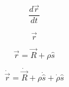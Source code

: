 \documentclass{article}
\begin{document}
\begin{equation}
\frac{d\vec{r}}{dt}
\end{equation}

\begin{equation}
\vec{r}
\end{equation}

\begin{equation}
\vec{r} = \vec{R} + \rho\hat{s}
\end{equation}

\begin{equation}
\dot{\vec{r}} = \dot{\vec{R}} + \rho\dot{\hat{s}} + \dot{\rho}\hat{s}
\end{equation}
\end{document}
